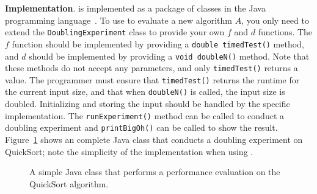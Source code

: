 
    {\bf Implementation}.  \toolname is implemented as a package of
    classes in the Java programming language~\cite{tool}.  To use \toolname to
    evaluate a new algorithm $A$, you only need to extend the
    \texttt{DoublingExperiment} class to provide your own $f$ and $d$
    functions.  The $f$ function should be implemented by providing a
    \texttt{double timedTest()} method, and $d$ should be implemented by
    providing a \texttt{void doubleN()} method. Note that these methods
    do not accept any parameters, and only \texttt{timedTest()} returns
    a value. The programmer must ensure that \texttt{timedTest()}
    returns the runtime for the current input size, and that when
    \texttt{doubleN()} is called, the input size is doubled.
    Initializing and storing the input should be handled by the specific
    implementation. The \texttt{runExperiment()} method can be called to
    conduct a doubling experiment and \texttt{printBigOh()} can be
    called to show the result. Figure~\ref{fig:qsprogram} shows an
    complete Java class that conducts a doubling experiment on
    QuickSort; note the simplicity of the implementation when using
    \toolname.



    \begin{figure}[t]
    
    \vspace{-0.15in}
    \caption{A simple Java class that performs a performance evaluation
    on the QuickSort algorithm.}\vspace{-0.20in}
    \label{fig:qsprogram}
    \end{figure}
